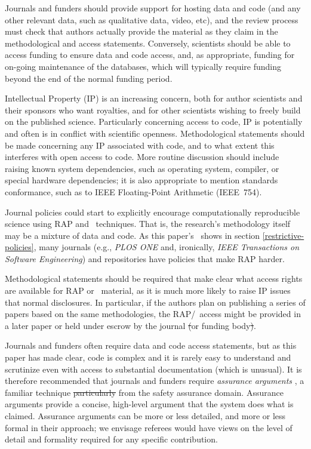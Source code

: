 \documentclass{comjnl}
\providecommand{\DIFdel}[1]{{\protect\color{red}\sout{#1}}}                      %
\providecommand{\DIFaddbegin}{} %
\providecommand{\DIFaddend}{} %
\providecommand{\DIFdelbegin}{} %
\providecommand{\DIFdelend}{} %
\begin{document}
\DIFaddend Journals and funders should provide support for hosting data and code (and any other relevant data, such as qualitative data, video, etc), and the review process must check that authors actually provide the material as they claim in the methodological and access statements. Conversely, scientists should be able to access funding to ensure data and code access, and, as appropriate, funding for on-going maintenance of the databases, which will typically require funding beyond the end of the normal funding period.

Intellectual Property (IP) is an increasing concern, both for author scientists and their sponsors who want royalties, and for other scientists wishing to freely build on the published science. Particularly concerning access to code, IP is potentially and often is in conflict with scientific openness. Methodological statements should be made concerning any IP associated with code, and to what extent this interferes with open access to code. More routine discussion should include raising known system dependencies, such as operating system, compiler, or special hardware dependencies; it is also appropriate to mention standards conformance, such as to IEEE Floating-Point Arithmetic (IEEE~754).

Journal policies could start to explicitly encourage computationally reproducible science using RAP and \RAPstar\ techniques. That is, the research's methodology itself may be a mixture of data and code. As this paper's \supplement\ shows in section \ref{restrictive-policies}, many journals (e.g., \emph{PLOS ONE\/} and, ironically, \emph{IEEE Transactions on Software Engineering\/}) and repositories have policies that make RAP harder. 
\DIFaddbegin 

\DIFaddend Methodological statements should be required that make clear what access rights are available for RAP or \RAPstar\ material, as it is much more likely to raise IP issues that normal disclosures. In particular, if the authors plan on publishing a series of papers based on the same methodologies, the RAP/\RAPstar\ access might be provided in a later paper or held under escrow by the journal \DIFdelbegin \DIFdel{(}\DIFdelend or funding body\DIFdelbegin \DIFdel{)}\DIFdelend .

Journals and funders often require data and code access statements, but as this paper has made clear, code is complex and it is rarely easy to understand and scrutinize even with access to substantial documentation (which is unusual). It is therefore recommended that journals and funders require \emph{assurance arguments} \cite{assurance-case}, a familiar technique \DIFdelbegin \DIFdel{particularly }\DIFdelend from the safety assurance domain. Assurance arguments provide a concise, high-level argument that the system does what is claimed. Assurance arguments can be more or less detailed, and more or less formal in their approach; we envisage referees would have views on the level of detail and formality required for any specific contribution.
\end{document}
